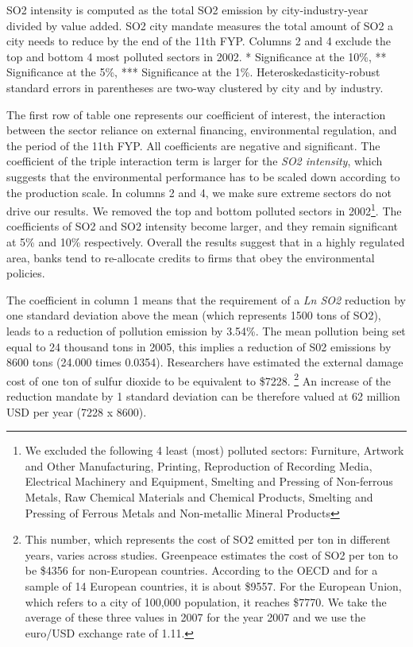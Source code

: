 \documentclass[12pt]{article}
\begin{document}
\begin{table}[htbp]
{\begin{threeparttable}
\begin{tabular}{l*{4}{c}}
\bottomrule
  \end{tabular}
  \begin{tablenotes}
      \small
      \item SO2 intensity is computed as the total SO2 emission by city-industry-year divided by value added. SO2 city mandate measures the total amount of SO2 a city needs to reduce by the end of the 11th FYP. Columns 2 and 4 exclude the top and bottom 4 most polluted sectors in 2002.
 * Significance at the 10\%, ** Significance at the 5\%, *** Significance at the 1\%. Heteroskedasticity-robust standard errors in parentheses are two-way clustered by city and by industry.
    \end{tablenotes}
    \label{tab:table2}
\end{threeparttable}}
\end{table}

The first row of table one represents our coefficient of interest, the interaction between the sector reliance on external financing, environmental regulation, and the period of the 11th FYP. All coefficients are negative and significant. The coefficient of the triple interaction term is larger for the \textit{SO2 intensity}, which suggests that the environmental performance has to be scaled down according to the production scale. In columns 2 and 4, we make sure extreme sectors do not drive our results. We removed the top and bottom polluted sectors in 2002\footnote{We excluded the following 4 least (most) polluted sectors: Furniture, Artwork and Other Manufacturing, Printing, Reproduction of Recording Media, Electrical Machinery and Equipment, Smelting and Pressing of Non-ferrous Metals, Raw Chemical Materials and Chemical Products, Smelting and Pressing of Ferrous Metals and  Non-metallic Mineral Products}. The coefficients of SO2 and SO2 intensity become larger, and they remain significant at 5\% and 10\% respectively. Overall the results suggest that in a highly regulated area, banks tend to re-allocate credits to firms that obey the environmental policies.

The coefficient in column 1 means that the requirement of a \textit{Ln SO2} reduction by one standard deviation above the mean (which represents 1500 tons of SO2), leads to a reduction of pollution emission by 3.54\%. The mean pollution being set equal to 24 thousand tons in 2005, this implies a reduction of S02 emissions by 8600 tons (24.000 times 0.0354). Researchers have estimated the external damage cost of one ton of sulfur dioxide to be equivalent to \$7228. \footnote{This number, which represents the cost of SO2 emitted per ton in different years, varies across studies. Greenpeace estimates the cost of SO2 per ton to be \$4356 for non-European countries. According to the OECD and for a sample of  14 European countries, it is about \$9557. For the European Union, which refers to a city of 100,000 population, it reaches \$7770. We take the average of these three values in 2007 for the year  2007 and we use the euro/USD exchange rate of 1.11.} An increase of the reduction mandate by 1 standard deviation can be therefore valued at 62 million USD per year (7228 x 8600). 
\end{document}
